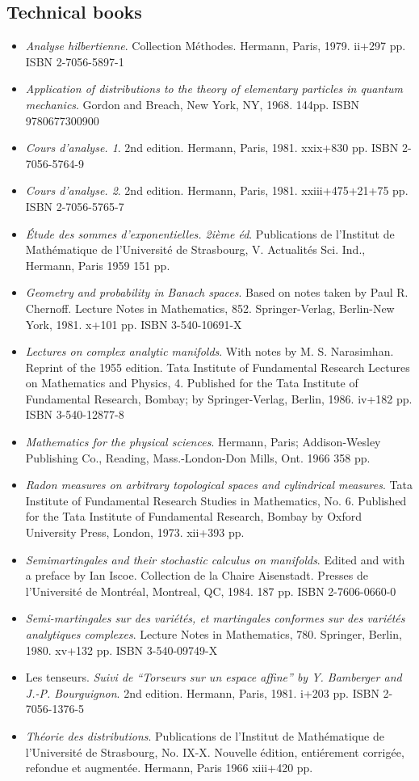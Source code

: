 \documentclass{book}
\numberwithin{equation}{section}
\begin{document}
\subsection{Technical books}
\begin{itemize}
    \item \textit{Analyse hilbertienne}. Collection Méthodes. Hermann, Paris, 1979. ii+297 pp. ISBN 2-7056-5897-1
    \item \textit{Application of distributions to the theory of elementary particles in quantum mechanics}. Gordon and Breach, New York, NY, 1968. 144pp. ISBN 9780677300900
    \item \textit{Cours d'analyse. 1}. 2nd edition. Hermann, Paris, 1981. xxix+830 pp. ISBN 2-7056-5764-9
    \item \textit{Cours d'analyse. 2}. 2nd edition. Hermann, Paris, 1981. xxiii+475+21+75 pp. ISBN 2-7056-5765-7
    \item [5] \textit{Étude des sommes d'exponentielles. 2ième éd}. Publications de l'Institut de Mathématique de l'Université de Strasbourg, V. Actualités Sci. Ind., Hermann, Paris 1959 151 pp.
    \item \textit{Geometry and probability in Banach spaces}. Based on notes taken by Paul R. Chernoff. Lecture Notes in Mathematics, 852. Springer-Verlag, Berlin-New York, 1981. x+101 pp. ISBN 3-540-10691-X
    \item \textit{Lectures on complex analytic manifolds}. With notes by M. S. Narasimhan. Reprint of the 1955 edition. Tata Institute of Fundamental Research Lectures on Mathematics and Physics, 4. Published for the Tata Institute of Fundamental Research, Bombay; by Springer-Verlag, Berlin, 1986. iv+182 pp. ISBN 3-540-12877-8
    \item \textit{Mathematics for the physical sciences}. Hermann, Paris; Addison-Wesley Publishing Co., Reading, Mass.-London-Don Mills, Ont. 1966 358 pp.
    \item \textit{Radon measures on arbitrary topological spaces and cylindrical measures}. Tata Institute of Fundamental Research Studies in Mathematics, No. 6. Published for the Tata Institute of Fundamental Research, Bombay by Oxford University Press, London, 1973. xii+393 pp.
    \item \textit{Semimartingales and their stochastic calculus on manifolds}. Edited and with a preface by Ian Iscoe. Collection de la Chaire Aisenstadt. Presses de l'Université de Montréal, Montreal, QC, 1984. 187 pp. ISBN 2-7606-0660-0
    \item \textit{Semi-martingales sur des variétés, et martingales conformes sur des variétés analytiques complexes}. Lecture Notes in Mathematics, 780. Springer, Berlin, 1980. xv+132 pp. ISBN 3-540-09749-X
    \item Les tenseurs. \textit{Suivi de ``Torseurs sur un espace affine'' by Y. Bamberger and J.-P. Bourguignon}. 2nd edition. Hermann, Paris, 1981. i+203 pp. ISBN 2-7056-1376-5
    \item [6] \textit{Théorie des distributions}. Publications de l'Institut de Mathématique de l'Université de Strasbourg, No. IX-X. Nouvelle édition, entiérement corrigée, refondue et augmentée. Hermann, Paris 1966 xiii+420 pp.
\end{itemize}
\end{document}
